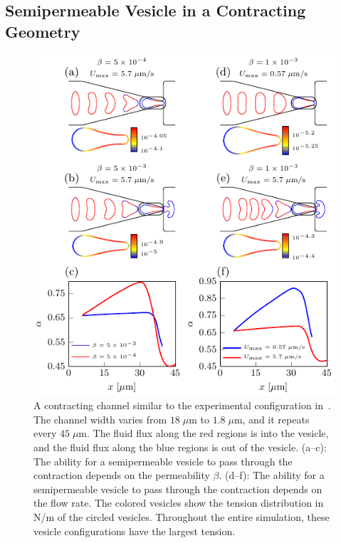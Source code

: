 \documentclass[prb,preprint,showpacs,preprintnumbers,amsmath,amssymb,longbibliography]{revtex4-1}
\newif\ifTikz
\begin{document}
\subsection{Semipermeable Vesicle in a Contracting Geometry} 
\begin{figure}[htp]
  \centering
  \ifTikz
  
  \else
  \includegraphics{figures/contractingComposite.pdf}
  \fi
  \caption{\label{fig:contractingComposite} A contracting channel
  similar to the experimental configuration in~\cite{wu2015critical}.
  The channel width varies from $18\;\mu$m to $1.8\;\mu$m, and it
  repeats every $45\;\mu$m. The fluid flux along the red regions is into
  the vesicle, and the fluid flux along the blue regions is out of the
  vesicle.  (a--c): The ability for a semipermeable vesicle to pass
  through the contraction depends on the permeability $\beta$. (d--f):
  The ability for a semipermeable vesicle to pass through the
  contraction depends on the flow rate. The colored vesicles show the
  tension distribution in N/m of the circled vesicles. Throughout the
  entire simulation, these vesicle configurations have the largest
  tension.}
\end{figure}
\end{document}
